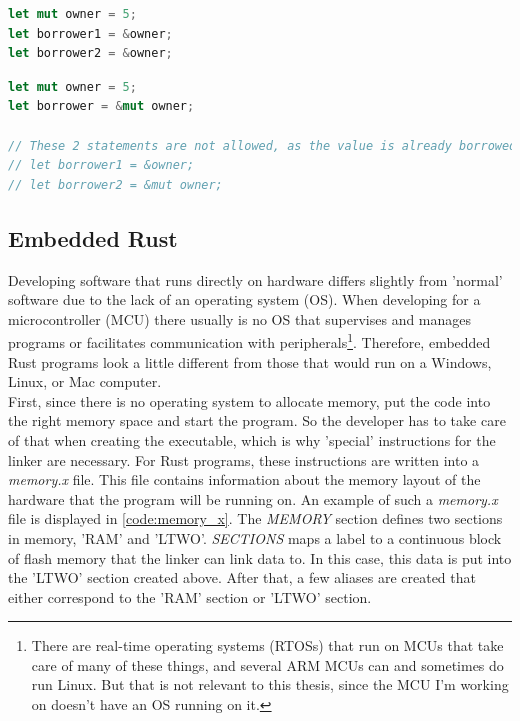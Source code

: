 \begin{minipage}{\textwidth}
\begin{lstlisting}[style=colorEX,language=Rust,caption={Simple example of an immutable borrow},label={code:borrow}]
let mut owner = 5;
let borrower1 = &owner;
let borrower2 = &owner;
\end{lstlisting}
\end{minipage}

\begin{minipage}{\textwidth}
\begin{lstlisting}[style=colorEX,language=Rust,caption={Simple example of a mutable borrow},label={code:mut_borrow}]
let mut owner = 5;
let borrower = &mut owner;

// These 2 statements are not allowed, as the value is already borrowed as mutable.
// let borrower1 = &owner;
// let borrower2 = &mut owner;
\end{lstlisting}
\end{minipage}

\subsection{Embedded Rust}

Developing software that runs directly on hardware differs slightly from 'normal' software due to the lack of an operating system (OS).
When developing for a microcontroller (MCU) there usually is no OS that supervises and manages programs or facilitates communication with peripherals\footnote
{There are real-time operating systems (RTOSs) that run on MCUs that take care of many of these things,
and several ARM MCUs can and sometimes do run Linux. But that is not relevant to this thesis, since the MCU I'm working on doesn't have an OS running on it.}.
Therefore, embedded Rust programs look a little different from those that would run on a Windows, Linux, or Mac computer.
\\
First, since there is no operating system to allocate memory, put the code into the right memory space and start the program.
So the developer has to take care of that when creating the executable, which is why 'special' instructions for the linker are necessary.
For Rust programs, these instructions are written into a \emph{memory.x} file.
This file contains information about the memory layout of the hardware that the program will be running on.
An example of such a \emph{memory.x} file is displayed in \ref{code:memory_x}.
The \emph{MEMORY} section defines two sections in memory, 'RAM' and 'LTWO'.
\emph{SECTIONS} maps a label to a continuous block of flash memory that the linker can link data to.
In this case, this data is put into the 'LTWO' section created above.
After that, a few aliases are created that either correspond to the 'RAM' section or 'LTWO' section.

